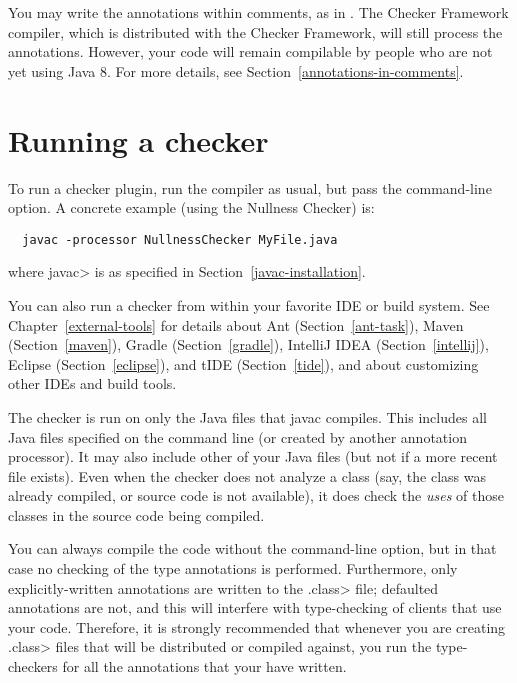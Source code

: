 You may write the annotations within comments, as in
.  The Checker Framework compiler, which is
distributed with the Checker Framework, will still process
the annotations.
However, your code will remain compilable by people who are not yet using
Java 8.  For more details, see
Section~\ref{annotations-in-comments}.


\section{Running a checker\label{running}}

To run a checker plugin, run the compiler  as usual,
but pass the  command-line
option.
A concrete example (using the Nullness Checker) is:

\begin{Verbatim}
  javac -processor NullnessChecker MyFile.java
\end{Verbatim}

\noindent
where \<javac> is as specified in Section~\ref{javac-installation}.

You can also run a checker from within your favorite IDE or build system.  See
Chapter~\ref{external-tools} for details about
Ant (Section~\ref{ant-task}),
Maven (Section~\ref{maven}),
Gradle (Section~\ref{gradle}),
IntelliJ IDEA (Section~\ref{intellij}),
Eclipse (Section~\ref{eclipse}),
and
tIDE (Section~\ref{tide}),
and about customizing other IDEs and build tools.

The checker is run on only the Java files that javac compiles.
This includes all Java files specified on the command line (or
created by another annotation processor).  It may also include other of
your Java files (but not if a more recent  file exists).
Even when the checker does not analyze a class (say, the class was
already compiled, or source code is not available), it does check
the \emph{uses} of those classes in the source code being compiled.

You can always compile the code without the 
command-line option, but in that case no checking of the type
annotations is performed.  Furthermore, only explicitly-written annotations
are written to the \<.class> file; defaulted annotations are not, and this
will interfere with type-checking of clients that use your code.
Therefore, it is strongly recommended that whenever you are creating
\<.class> files that will be distributed or compiled against, you run the
type-checkers for all the annotations that your have written.


